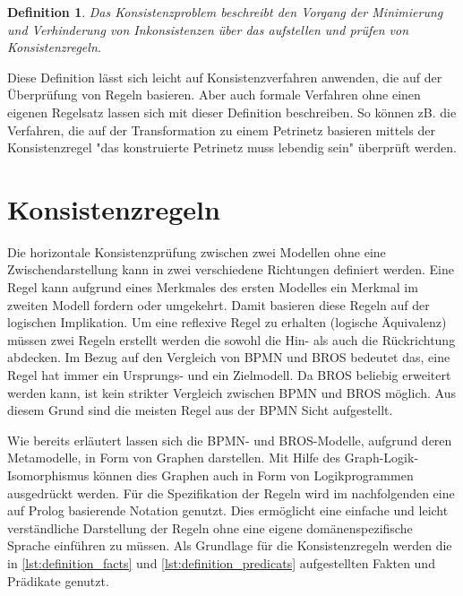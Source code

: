 \newtheorem*{konsistenzproblem}{Definition}

\begin{konsistenzproblem}
    Das Konsistenzproblem beschreibt den Vorgang der Minimierung und Verhinderung von Inkonsistenzen über das aufstellen und prüfen von Konsistenzregeln.
\end{konsistenzproblem}

Diese Definition lässt sich leicht auf Konsistenzverfahren anwenden, die auf der Überprüfung von Regeln basieren.
Aber auch formale Verfahren ohne einen eigenen Regelsatz lassen sich mit dieser Definition beschreiben.
So können zB. die Verfahren, die auf der Transformation zu einem Petrinetz basieren mittels der Konsistenzregel "das konstruierte Petrinetz muss lebendig sein" überprüft werden.

\section{Konsistenzregeln} \label{sec:Konsistenzregeln}

Die horizontale Konsistenzprüfung zwischen zwei Modellen ohne eine Zwischendarstellung kann in zwei verschiedene Richtungen definiert werden.
Eine Regel kann aufgrund eines Merkmales des ersten Modelles ein Merkmal im zweiten Modell fordern oder umgekehrt.
Damit basieren diese Regeln auf der logischen Implikation.
Um eine reflexive Regel zu erhalten (logische Äquivalenz) müssen zwei Regeln erstellt werden die sowohl die Hin- als auch die Rückrichtung abdecken.
Im Bezug auf den Vergleich von BPMN und BROS bedeutet das, eine Regel hat immer ein Ursprungs- und ein Zielmodell.
Da BROS beliebig erweitert werden kann, ist kein strikter Vergleich zwischen BPMN und BROS möglich.
Aus diesem Grund sind die meisten Regel aus der BPMN Sicht aufgestellt.

Wie bereits erläutert lassen sich die BPMN- und BROS-Modelle, aufgrund deren Metamodelle, in Form von Graphen darstellen.
Mit Hilfe des Graph-Logik-Isomorphismus können dies Graphen auch in Form von Logikprogrammen ausgedrückt werden.
Für die Spezifikation der Regeln wird im nachfolgenden eine auf Prolog basierende Notation genutzt.
Dies ermöglicht eine einfache und leicht verständliche Darstellung der Regeln ohne eine eigene domänenspezifische Sprache einführen zu müssen.
Als Grundlage für die Konsistenzregeln werden die in \cref{lst:definition_facts} und \cref{lst:definition_predicats} aufgestellten Fakten und Prädikate genutzt.

